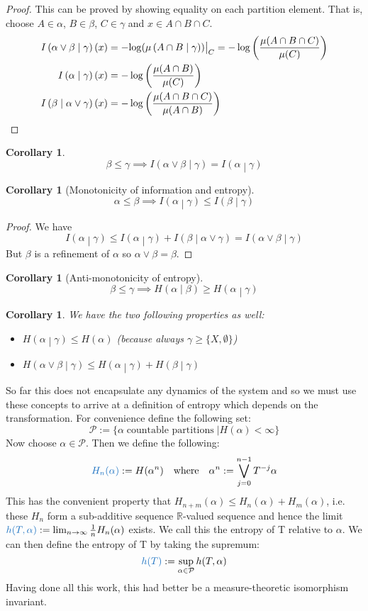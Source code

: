 \documentclass[11pt]{article}
\newcommand{\defeq}{:=}
\newcommand\restr[2]{{%
  \left.\kern-\nulldelimiterspace %
  #1 %
  \vphantom{\big|} %
  \right|_{#2} %
  }}
\newcommand{\relmiddle}[1]{\mathrel{}\middle#1\mathrel{}}
\newcommand{\rmv}{\relmiddle|}
\newcommand{\R}{\mathbb{R}}
\newcommand{\gvn}[2]{\ensuremath{\left(#1\rmv#2\right)}}
\newcommand{\infog}[2]{\ensuremath{I\gvn{#1}{#2}}}
\newcommand{\entrg}[2]{\ensuremath{H\gvn{#1}{#2}}}
\newcommand{\mdf}[1]{{\color{RoyalBlue} #1}}
\newtheorem{cor}[prop]{Corollary}
\begin{document}
\begin{proof}
This can be proved by showing equality on each partition element.
That is, choose $A\in \alpha$, $B\in \beta$, $C\in\gamma$ and $x \in A \cap B \cap C$.
\begin{align*}
	\infog{\alpha \vee \beta}{\gamma}(x)&=-\restr{\log(\mu\gvn{A\cap B}{\gamma})}{C}=-\log\left( \frac{\mu(A\cap B \cap C)}{\mu(C)}\right)\\
	\infog{\alpha}{\gamma}(x)&= - \log\left(\frac{\mu(A \cap B)}{\mu(C)}\right) \\
	\infog{\beta}{\alpha\vee\gamma}(x)& =-\log\left(\frac{\mu(A\cap B \cap C)}{\mu(A \cap B)}\right)
\end{align*}
\end{proof}

\begin{cor}
	$$\beta\leq\gamma\implies\infog{\alpha\vee\beta}{\gamma}=\infog{\alpha}{\gamma}$$
\end{cor}

\begin{cor}[Monotonicity of information and entropy]
	$$\alpha\leq\beta\implies\infog{\alpha}{\gamma}\leq\infog{\beta}{\gamma}$$
\end{cor}

\begin{proof}
We have 
\[
\infog{\alpha}{\gamma} \leq \infog{\alpha}{\gamma} + \infog{\beta}{\alpha \vee \gamma} = \infog{\alpha\vee \beta}{\gamma}
\]
But $\beta$ is a refinement of $\alpha$ so $\alpha \vee \beta = \beta$.
\end{proof}

\begin{cor}[Anti-monotonicity of entropy]
	$$\beta\leq\gamma\implies\entrg{\alpha}{\beta}\geq\entrg{\alpha}{\gamma}$$
\end{cor}
\begin{cor}
We have the two following properties as well:
\begin{itemize}
	\item $\entrg{\alpha}{\gamma}\leq H(\alpha)$ (because always $\gamma\geq\{X,\emptyset\}$)
	\item $\entrg{\alpha\vee\beta}{\gamma}\leq\entrg{\alpha}{\gamma}+\entrg{\beta}{\gamma}$
\end{itemize}
\end{cor}
So far this does not encapsulate any dynamics of the system and so we must use these concepts to arrive at a definition of entropy which depends on the transformation. For convenience define the following set:
$$\mathcal{P}\defeq\{\alpha\;\text{countable partitions}\;|H(\alpha) < \infty\}$$
Now choose $\alpha\in\mathcal{P}$. Then we define the following:
$$\mdf{H_n(\alpha)}\defeq H(\alpha^n)\quad\text{where}\quad\alpha^n\defeq\bigvee_{j=0}^{n-1}T^{-j}\alpha$$
This has the convenient property that $H_{n+m}(\alpha)\leq H_n(\alpha)+H_m(\alpha)$, i.e. these $H_n$ form a sub-additive sequence $\R$-valued sequence and hence the limit $\mdf{h(T,\alpha)}\defeq\lim_{n\to\infty}\frac{1}{n}H_n(\alpha)$ exists. We call this the \mdf{entropy of T relative to $\alpha$}.
We can then define the \mdf{entropy of T} by taking the supremum:
$$\mdf{h(T)}\defeq\sup_{\alpha\in\mathcal{P}}h(T,\alpha)$$
Having done all this work, this had better be a measure-theoretic isomorphism invariant.
\end{document}
